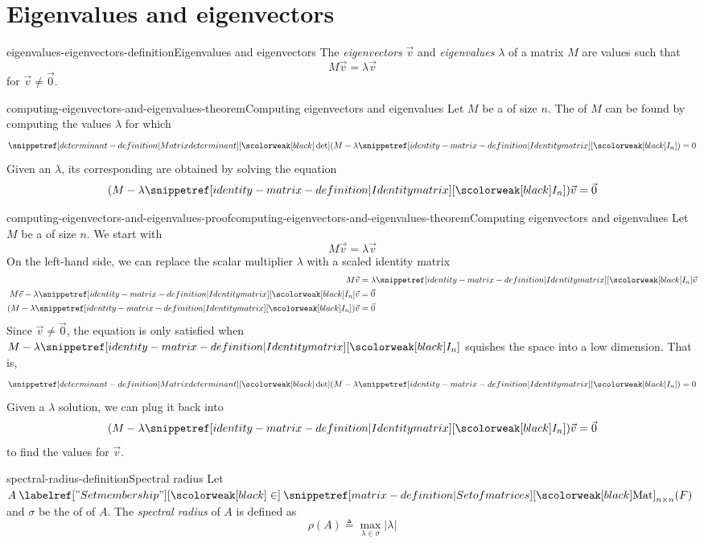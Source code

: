\documentclass[preview]{standalone}
\begin{document}
\genpage

\section{Eigenvalues and eigenvectors}

\begin{snippetdefinition}{eigenvalues-eigenvectors-definition}{Eigenvalues and eigenvectors}
    The \textit{eigenvectors} \(\vec{v}\) and \textit{eigenvalues} \(\lambda\) of a matrix \(M\)
    are values such that
    \[
        M\vec{v} = \lambda \vec{v}
    \]
    for \(\vec{v}\neq \vec{0}\).
\end{snippetdefinition}


\begin{snippettheorem}{computing-eigenvectors-and-eigenvalues-theorem}{Computing eigenvectors and eigenvalues}
    Let \(M\) be a \matrix of size \(n\).
    The \eigenvalue[eigenvalues] of \(M\) can be found by computing the values \(\lambda\) for which
    \[ \det(M-\lambda \identmatrix{n}) = 0 \]
    Given an \eigenvalue \(\lambda\), its corresponding \eigenvector[eigenvectors] are
    obtained by solving the equation
    \[ (M - \lambda \identmatrix{n})\vec{v} = \vec{0} \]
\end{snippettheorem}

\begin{snippetproof}{computing-eigenvectors-and-eigenvalues-proof}{computing-eigenvectors-and-eigenvalues-theorem}{Computing eigenvectors and eigenvalues}
    Let \(M\) be a \matrix of size \(n\).
    We start with
    \[
        M\vec{v} = \lambda \vec{v}
    \]
    On the left-hand side, we can replace the scalar multiplier \(\lambda\) with
    a scaled identity matrix
    \begin{align*}
        M\vec{v} &= \lambda \identmatrix{n} \vec{v} \\
        M\vec{v} - \lambda \identmatrix{n} \vec{v} &= \vec{0} \\
        (M - \lambda \identmatrix{n})\vec{v} &= \vec{0}
    \end{align*}
    Since \(\vec{v} \neq \vec{0}\), the equation is only satisfied
    when \(M - \lambda \identmatrix{n}\) squishes the space into a low dimension. That is,
    \[ \det(M-\lambda \identmatrix{n}) = 0 \]
    Given a \(\lambda\) solution, we can plug it back into
    \[ (M - \lambda \identmatrix{n})\vec{v} = \vec{0} \] to find the values for \(\vec{v}\).
\end{snippetproof}

\begin{snippetdefinition}{spectral-radius-definition}{Spectral radius}
    Let \(A \in \matrices_{n\times n}(F)\) and \(\sigma\) be the \set of \eigenvalue[eigenvalues] of \(A\).
    The \emph{spectral radius} of \(A\) is defined as
    \[
        \rho(A) \triangleq \max_{\lambda\in\sigma} |\lambda|
    \]
\end{snippetdefinition}
\end{document}
